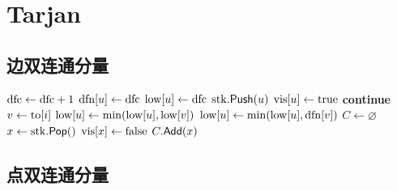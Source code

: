 \section{Tarjan}\label{sec:tarjan}

\subsection{边双连通分量}\label{sec:edge-bcc}

\begin{algorithm}[H]
    \caption{边双连通分量（Tarjan）}
    \begin{algorithmic}[1]
            \State $\pvar{dfc} \gets \pvar{dfc} + 1$
            \State $\pvar{dfn}[u] \gets \pvar{dfc}$
            \State $\pvar{low}[u] \gets \pvar{dfc}$
            \State $\pvar{stk}.\Call{Push}{u}$
            \State $\pvar{vis}[u] \gets \mathrm{true}$
                    \State \textbf{continue}
                \EndIf
                \State $v \gets \pvar{to}[i]$
                    \State {}
                    \State $\pvar{low}[u] \gets \min(\pvar{low}[u], \pvar{low}[v])$
                    \State $\pvar{low}[u] \gets \min(\pvar{low}[u], \pvar{dfn}[v])$
                \EndIf
            \EndFor
                \State $C \gets \varnothing$
                \Repeat
                    \State $x \gets \pvar{stk}.\Call{Pop}{}$
                    \State $\pvar{vis}[x] \gets \mathrm{false}$
                    \State $C.\mathsf{Add}(x)$
            \EndIf
        \EndProcedure
    \end{algorithmic}
\end{algorithm}

\subsection{点双连通分量}\label{sec:vertex-bcc}

